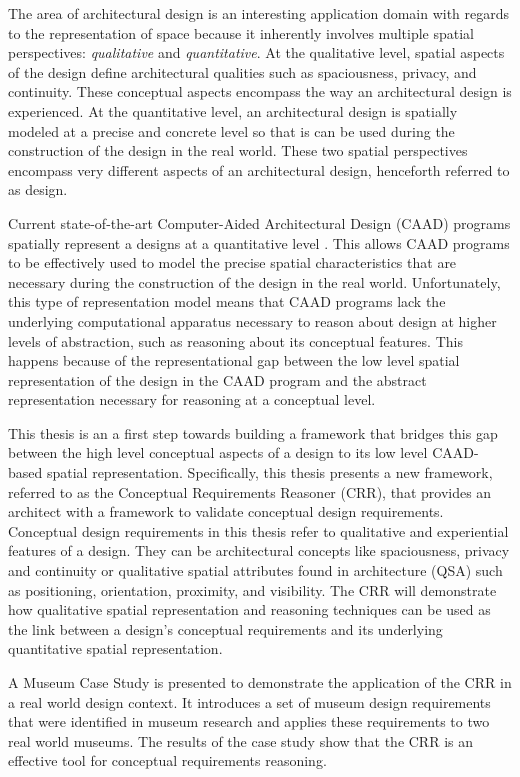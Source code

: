 \documentclass[12pt]{ucthesis}
\begin{document}
The area of architectural design is an interesting application domain with regards to the representation of space because it inherently involves multiple spatial perspectives: \emph{qualitative} and \emph{quantitative}. At the qualitative level, spatial aspects of the design define architectural qualities such as spaciousness, privacy, and continuity. These conceptual aspects encompass the way an architectural design is experienced. At the quantitative level, an architectural design is spatially modeled at a precise and concrete level so that is can be used during the construction of the design in the real world. These two spatial perspectives encompass very different aspects of an architectural design, henceforth referred to as design.

Current state-of-the-art Computer-Aided Architectural Design (CAAD) programs spatially represent a designs at a quantitative level \cite{ArchiCAD}. This allows CAAD programs to be effectively used to model the precise spatial characteristics that are necessary during the construction of the design in the real world. Unfortunately, this type of representation model means that CAAD programs lack the underlying computational apparatus necessary to reason about design at higher levels of abstraction, such as reasoning about its conceptual features. This happens because of the representational gap between the low level spatial representation of the design in the CAAD program and the abstract representation necessary for reasoning at a conceptual level. 

This thesis is an a first step towards building a framework that bridges this gap between the high level conceptual aspects of a design to its low level CAAD-based spatial representation. Specifically, this thesis presents a new framework, referred to as the Conceptual Requirements Reasoner (CRR), that provides an architect with a framework to validate conceptual design requirements. Conceptual design requirements in this thesis refer to qualitative and experiential features of a design. They can be architectural concepts like spaciousness, privacy and continuity or qualitative spatial attributes found in architecture (QSA) such as positioning, orientation, proximity, and visibility. The CRR will demonstrate how qualitative spatial representation and reasoning techniques can be used as the link between a design's conceptual requirements and its underlying quantitative spatial representation.

A Museum Case Study is presented to demonstrate the application of the CRR in a real world design context. It introduces a set of museum design requirements that were identified in museum research and applies these requirements to two real world museums. The results of the case study show that the CRR is an effective tool for conceptual requirements reasoning.
\end{document}
